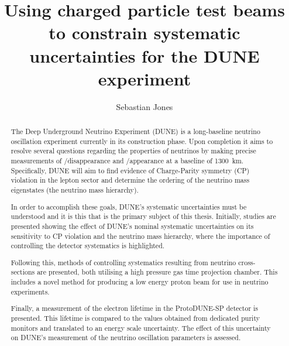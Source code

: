 
\title{Using charged particle test beams to constrain systematic uncertainties for the DUNE experiment}
\author{Sebastian Jones}

\maketitle
\makedeclaration

\begin{abstract} %

The Deep Underground Neutrino Experiment (DUNE) is a long-baseline neutrino oscillation experiment currently in its construction phase.
Upon completion it aims to resolve several questions regarding the properties of neutrinos by making precise measurements of \numu/\anumu disappearance and \nue/\anue appearance at a baseline of \SI{1300}{\km}.
Specifically, DUNE will aim to find evidence of Charge-Parity symmetry (CP) violation in the lepton sector and determine the ordering of the neutrino mass eigenstates (the neutrino mass hierarchy).

In order to accomplish these goals, DUNE's systematic uncertainties must be understood and it is this that is the primary subject of this thesis.
Initially, studies are presented showing the effect of DUNE's nominal systematic uncertainties on its sensitivity to CP violation and the neutrino mass hierarchy, where the importance of controlling the detector systematics is highlighted. 

Following this, methods of controlling systematics resulting from neutrino cross-sections are presented, both utilising a high pressure gas time projection chamber.
This includes a novel method for producing a low energy proton beam for use in neutrino experiments.

Finally, a measurement of the electron lifetime in the ProtoDUNE-SP detector is presented.
This lifetime is compared to the values obtained from dedicated purity monitors and translated to an energy scale uncertainty.
The effect of this uncertainty on DUNE's measurement of the neutrino oscillation parameters is assessed.

\end{abstract}


